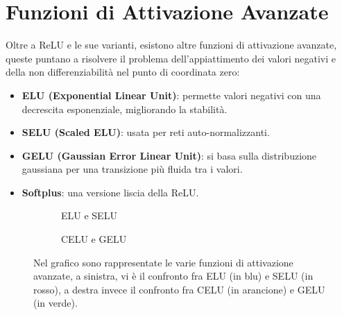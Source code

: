 \section{Funzioni di Attivazione Avanzate}
Oltre a ReLU e le sue varianti, esistono altre funzioni di attivazione avanzate, queste puntano a risolvere il problema dell'appiattimento dei valori negativi e della non differenziabilità nel punto di coordinata zero:
\begin{itemize}
    \item \textbf{ELU (Exponential Linear Unit)}: permette valori negativi con una decrescita esponenziale, migliorando la stabilità.
    \item \textbf{SELU (Scaled ELU)}: usata per reti auto-normalizzanti.
    \item \textbf{GELU (Gaussian Error Linear Unit)}: si basa sulla distribuzione gaussiana per una transizione più fluida tra i valori.
    \item \textbf{Softplus}: una versione liscia della ReLU.
\end{itemize}

\begin{figure}[h]
    \begin{subfigure}{0.35\textwidth}
        \caption{ELU e SELU}
    \end{subfigure}
    \qquad\qquad\quad
    \begin{subfigure}{0.35\textwidth}
        \caption{CELU e GELU}
    \end{subfigure}
    \caption{Nel grafico sono rappresentate le varie funzioni di attivazione avanzate, a sinistra, vi è il confronto fra ELU (in blu) e SELU (in rosso), a destra invece il confronto fra CELU (in arancione) e GELU (in verde).}
\end{figure}

